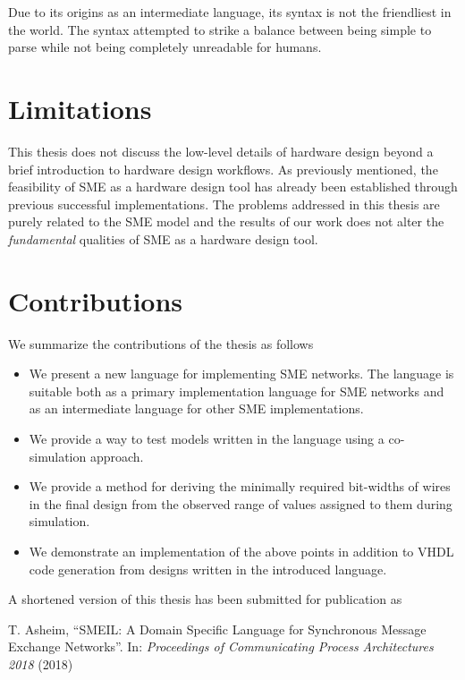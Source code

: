Due to its origins as an intermediate language, its syntax is not the
friendliest in the world. The syntax attempted to strike a balance between being
simple to parse while not being completely unreadable for humans.

\section{Limitations}
This thesis does not discuss the low-level details of hardware design beyond a
brief introduction to hardware design workflows. As previously mentioned, the
feasibility of SME as a hardware design tool has already been established
through previous successful implementations. The problems addressed in this
thesis are purely related to the SME model and the results of our work does not
alter the {\itshape fundamental} qualities of SME as a hardware design tool.


\section{Contributions}
We summarize the contributions of the thesis as follows

\begin{itemize}
\item We present a new language for implementing SME networks. The language is
  suitable both as a primary implementation language for SME networks and as an
  intermediate language for other SME implementations.
\item We provide a way to test models written in the language using a
  co-simulation approach.
\item We provide a method for deriving the minimally required bit-widths of
  wires in the final design from the observed range of values assigned to them
  during simulation.
\item We demonstrate an implementation of the above points in addition to VHDL
  code generation from designs written in the introduced language.
\end{itemize}

\noindent A shortened version of this thesis has been submitted for publication as

\begin{center}
\begin{minipage}{0.8\textwidth}
  T. Asheim, “SMEIL: A Domain Specific Language for Synchronous Message Exchange
  Networks”. In: {\itshape Proceedings of Communicating Process Architectures
    2018} (2018)
\end{minipage}
\end{center}

